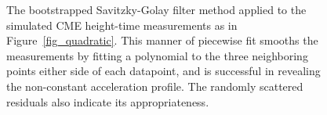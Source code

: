 \documentclass[structabstract]{aa}
\begin{document}
\begin{figure}[t]
\centering
{}
\caption{The bootstrapped Savitzky-Golay filter method applied to the simulated CME height-time measurements as in Figure~\ref{fig_quadratic}. This manner of piecewise fit smooths the measurements by fitting a polynomial to the three neighboring points either side of each datapoint, and is successful in revealing the non-constant acceleration profile. The randomly scattered residuals also indicate its appropriateness.}
\label{fig_savgol}
\end{figure}
\end{document}
